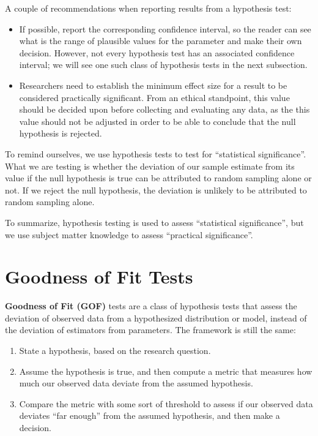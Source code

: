\documentclass[
]{book}
\providecommand{\tightlist}{%
  \setlength{\itemsep}{0pt}\setlength{\parskip}{0pt}}
\begin{document}
A couple of recommendations when reporting results from a hypothesis test:

\begin{itemize}
\item
  If possible, report the corresponding confidence interval, so the reader can see what is the range of plausible values for the parameter and make their own decision. However, not every hypothesis test has an associated confidence interval; we will see one such class of hypothesis tests in the next subsection.
\item
  Researchers need to establish the minimum effect size for a result to be considered practically significant. From an ethical standpoint, this value should be decided upon before collecting and evaluating any data, as the this value should not be adjusted in order to be able to conclude that the null hypothesis is rejected.
\end{itemize}

To remind ourselves, we use hypothesis tests to test for ``statistical significance''. What we are testing is whether the deviation of our sample estimate from its value if the null hypothesis is true can be attributed to random sampling alone or not. If we reject the null hypothesis, the deviation is unlikely to be attributed to random sampling alone.

To summarize, hypothesis testing is used to assess ``statistical significance'', but we use subject matter knowledge to assess ``practical significance''.

\hypertarget{GOF}{%
\section{Goodness of Fit Tests}\label{GOF}}

\textbf{Goodness of Fit (GOF)} tests are a class of hypothesis tests that assess the deviation of observed data from a hypothesized distribution or model, instead of the deviation of estimators from parameters. The framework is still the same:

\begin{enumerate}
\def\labelenumi{\arabic{enumi}.}
\tightlist
\item
  State a hypothesis, based on the research question.
\item
  Assume the hypothesis is true, and then compute a metric that measures how much our observed data deviate from the assumed hypothesis.
\item
  Compare the metric with some sort of threshold to assess if our observed data deviates ``far enough'' from the assumed hypothesis, and then make a decision.
\end{enumerate}
\end{document}
